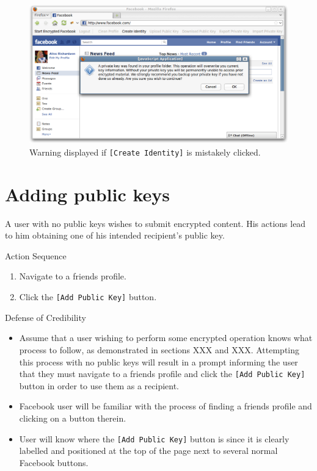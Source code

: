     \begin{figure}[tbph]
        \begin{center}
        
                \includegraphics[width=12cm]{screens/create-warning.png}

            \caption{Warning displayed if {\tt [Create Identity]} is mistakely clicked.}
            \label{scn:create}
        \end{center}
    \end{figure}

\section{Adding public keys}
A user with no public keys wishes to submit encrypted content. His actions lead to him obtaining one of his intended recipient's public key.

\begin{desc}

    \item[Action Sequence] \hfill
    \begin{enumerate}
        \item Navigate to a friends profile.
        \item Click the {\tt [Add Public Key]} button.
    \end{enumerate}
    
    \item[Defense of Credibility] \hfill
    \begin{itemize}
        \item Assume that a user wishing to perform some encrypted operation knows what process to follow, as demonstrated in sections XXX and XXX. Attempting this process with no public keys will result in a prompt informing the user that they must navigate to a friends profile and click the {\tt [Add Public Key]} button in order to use them as a recipient.
    
        \item Facebook user will be familiar with the process of finding a friends profile and clicking on a button therein.
        
        \item User will know where the {\tt [Add Public Key]} button is since it is clearly labelled and positioned at the top of the page next to several normal Facebook buttons.
        
    \end{itemize}
    
\end{desc}

